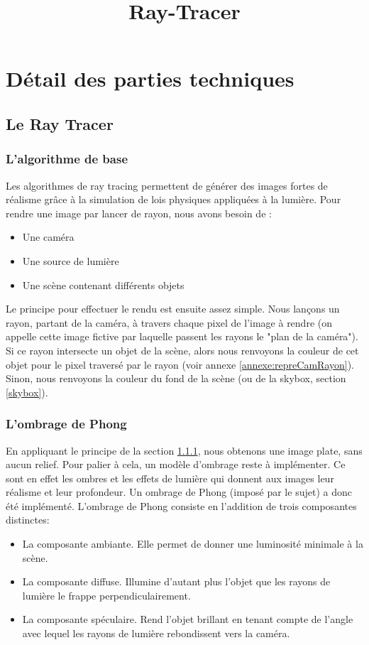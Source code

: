 \documentclass[11pt]{article}
\author{}
\title{Ray-Tracer}
\date{}
\begin{document}
\tableofcontents
\newpage

\maketitle

\section{Détail des parties techniques}
\subsection{Le Ray Tracer}
\subsubsection{L'algorithme de base}
\label{rayTracingBase}
Les algorithmes de ray tracing permettent de générer des images fortes de réalisme grâce à la simulation de lois physiques appliquées à la lumière. Pour rendre une image par lancer de rayon, nous avons besoin de :
\begin{itemize}
	\item {Une caméra}
	\item {Une source de lumière}
	\item{Une scène contenant différents objets}
\end{itemize}
Le principe pour effectuer le rendu est ensuite assez simple. Nous lançons un rayon, partant de la caméra, à travers chaque pixel de l'image à rendre (on appelle cette image fictive par laquelle passent les rayons le "plan de la caméra"). Si ce rayon intersecte un objet de la scène, alors nous renvoyons la couleur de cet objet pour le pixel traversé par le rayon (voir annexe \ref{annexe:repreCamRayon}). Sinon, nous renvoyons la couleur du fond de la scène (ou de la skybox, section \ref{skybox}).
\subsubsection{L'ombrage de Phong}
\label{ombragePhong}

En appliquant le principe de la section \ref{rayTracingBase}, nous obtenons une image plate, sans aucun relief. Pour palier à cela, un modèle d'ombrage reste à implémenter. Ce sont en effet les ombres et les effets de lumière qui donnent aux images leur réalisme et leur profondeur. Un ombrage de Phong (imposé par le sujet) a donc été implémenté. L'ombrage de Phong consiste en l'addition de trois composantes distinctes:
\begin{itemize}
	\item {La composante ambiante. Elle permet de donner une luminosité minimale à la scène.}
	\item {La composante diffuse. Illumine d'autant plus l'objet que les rayons de lumière le frappe perpendiculairement.}
	\item {La composante spéculaire. Rend l'objet brillant en tenant compte de l'angle avec lequel les rayons de lumière rebondissent vers la caméra.}
\end{itemize}
\end{document}
